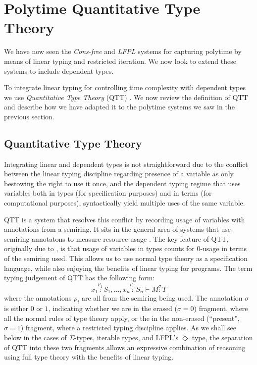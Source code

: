 \documentclass[acmsmall,review,screen,anonymous]{acmart}
\begin{document}
\section{Polytime Quantitative Type Theory}
\label{sec:qtt}

We have now seen the \emph{Cons-free} and \emph{LFPL} systems for
capturing polytime by means of linear typing and restricted
iteration. We now look to extend these systems to include dependent
types.

To integrate linear typing for controlling time complexity with
dependent types we use \emph{Quantitative Type Theory} (QTT)
\cite{atkey18qtt}. We now review the definition of QTT and describe
how we have adapted it to the polytime systems we saw in the previous
section.

\subsection{Quantitative Type Theory}
\label{sec:qtt-basic}

Integrating linear and dependent types is not straightforward due to
the conflict between the linear typing discipline regarding presence
of a variable as only bestowing the right to use it once, and the
dependent typing regime that uses variables both in types (for
specification purposes) and in terms (for computational purposes),
syntactically yield multiple uses of the same variable.

QTT is a system that resolves this conflict by recording usage of
variables with annotations from a semiring. It sits in the general
area of systems that use semiring annotatons to measure resource usage
\cite{BLAH}. The key feature of QTT, originally due to
\cite{mcbride16}, is that usage of variables in types counts for
$0$-usage in terms of the semiring used. This allows us to use normal
type theory as a specification language, while also enjoying the
benefits of linear typing for programs. The term typing judgement of
QTT has the following form:
\begin{displaymath}
  x_1 \stackrel{\rho_1}: S_1, \dots, x_n \stackrel{\rho_n}: S_n \vdash M \stackrel\sigma: T
\end{displaymath}
where the annotations $\rho_i$ are all from the semiring being
used. The annotation $\sigma$ is either $0$ or $1$, indicating whether
we are in the erased ($\sigma = 0$) fragment, where all the normal
rules of type theory apply, or the in the non-erased (``present'',
$\sigma = 1$) fragment, where a restricted typing discipline applies.
As we shall see below in the cases of $\Sigma$-types, iterable types,
and LFPL's $\Diamond$ type, the separation of QTT into these two
fragments allows an expressive combination of reasoning using full
type theory with the benefits of linear typing.
\end{document}
